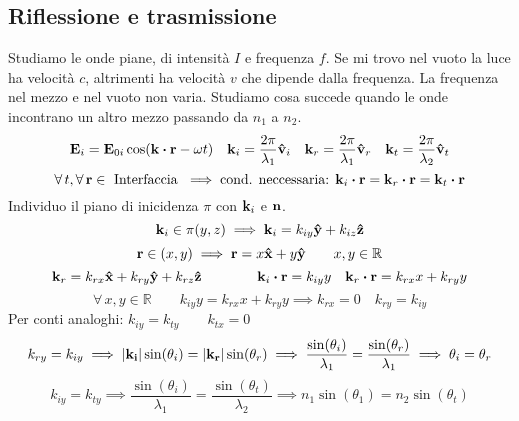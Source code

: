 \documentclass[12pt,a4paper]{article}
\begin{document}
\subsection{Riflessione e trasmissione}
Studiamo le onde piane, di intensità $I$ e frequenza $f$. Se mi trovo nel vuoto la luce ha velocità $c$, altrimenti
ha velocità $v$ che dipende dalla frequenza. La frequenza nel mezzo e nel vuoto non varia.
Studiamo cosa succede quando le onde incontrano un altro mezzo passando da $n_1$ a $n_2$.
\begin{equation*}
    \vb{E}_i= \vb{E}_{0i}\cos(\vb{k}\vdot\vb{r}-\omega t) \quad \vb{k}_i=\frac{2\pi}{\lambda_1}\vu{v}_i
    \quad \vb{k}_r=\frac{2\pi}{\lambda_1}\vu{v}_r \quad \vb{k}_t=\frac{2\pi}{\lambda_2}\vu{v}_t
\end{equation*}
\begin{equation*}
    \forall\,t, \forall\,\vb{r} \in \text{ Interfaccia }\implies \text{cond. neccessaria: } \vb{k}_i\vdot\vb{r}=\vb{k}_r\vdot\vb{r}= \vb{k}_t\vdot\vb{r}
\end{equation*}
Individuo il piano di inicidenza $\pi$ con $\vb{k}_i$ e $\vb{n}$.
\begin{equation*}
    \vb{k}_i \in \pi (y,z) \implies\vb{k}_i= k_{iy}\vu{y}+ k_{iz}\vu{z}
\end{equation*}
\begin{equation*}
    \vb{r}\in(x,y)\implies \vb{r}= x\vu{x}+ y\vu{y} \qquad x,y \in \mathbb{R}
\end{equation*}
\begin{equation*}
    \vb{k}_r= k_{rx}\vu{x}+ k_{ry}\vu{y}+ k_{rz}\vu{z} \qquad\qquad \vb{k}_i\vdot\vb{r}= k_{iy}y 
    \quad \vb{k}_r\vdot\vb{r}= k_{rx}x+ k_{ry}y
\end{equation*}
\begin{equation*}
    \forall\,x,y \in \mathbb{R} \qquad k_{iy}y = k_{rx} x + k_{ry} y\implies k_{rx}= 0 \quad k_{ry}= k_{iy}
\end{equation*}
Per conti analoghi: $k_{iy}= k_{ty}\qquad k_{tx}= 0$
\begin{equation*}
    k_{ry}= k_{iy}\implies \abs{\vb{k_i}}\sin(\theta_i)=\abs{\vb{k_r}}\sin(\theta_r)
    \implies \frac{\sin(\theta_i)}{\lambda_1}= \frac{\sin(\theta_r)}{\lambda_1}  \implies \theta_i=\theta_r
\end{equation*}
\begin{equation*}
    k_{iy}=k_{ty} \implies\frac{\sin(\theta_i)}{\lambda_1}= \frac{\sin(\theta_t)}{\lambda_2} \implies n_1\sin(\theta_1)= n_2\sin(\theta_t) 
\end{equation*}
\end{document}
